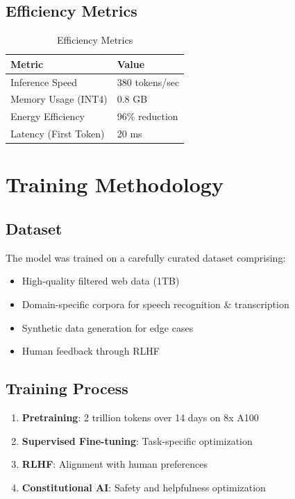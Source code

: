 \documentclass[11pt,a4paper]{article}
\begin{document}
\subsection{Efficiency Metrics}

\begin{table}[H]
\centering
\begin{tabular}{ll}
\toprule
\textbf{Metric} & \textbf{Value} \\
\midrule
Inference Speed & 380 tokens/sec \\
Memory Usage (INT4) & 0.8 GB \\
Energy Efficiency & 96\% reduction \\
Latency (First Token) & 20 ms \\
\bottomrule
\end{tabular}
\caption{Efficiency Metrics}
\end{table}

\section{Training Methodology}

\subsection{Dataset}
The model was trained on a carefully curated dataset comprising:
\begin{itemize}
    \item High-quality filtered web data (1TB)
    \item Domain-specific corpora for speech recognition \& transcription
    \item Synthetic data generation for edge cases
    \item Human feedback through RLHF
\end{itemize}

\subsection{Training Process}
\begin{enumerate}
    \item \textbf{Pretraining}: 2 trillion tokens over 14 days on 8x A100
    \item \textbf{Supervised Fine-tuning}: Task-specific optimization
    \item \textbf{RLHF}: Alignment with human preferences
    \item \textbf{Constitutional AI}: Safety and helpfulness optimization
\end{enumerate}
\end{document}
